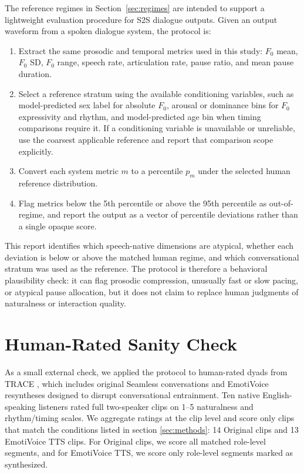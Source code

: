 \documentclass[conference]{IEEEtran}
\begin{document}
The reference regimes in Section~\ref{sec:regimes} are intended to support a lightweight evaluation procedure for S2S dialogue outputs. 
Given an output waveform from a spoken dialogue system, the protocol is:
\begin{enumerate}
    \item Extract the same prosodic and temporal metrics used in this study: $F_0$ mean, $F_0$ SD, $F_0$ range, speech rate, articulation rate, pause ratio, and mean pause duration.
    \item Select a reference stratum using the available conditioning variables, such as model-predicted sex label for absolute $F_0$, arousal or dominance bins for $F_0$ expressivity and rhythm, and model-predicted age bin when timing comparisons require it. If a conditioning variable is unavailable or unreliable, use the coarsest applicable reference and report that comparison scope explicitly.
    \item Convert each system metric $m$ to a percentile $p_m$ under the selected human reference distribution.
    \item Flag metrics below the 5th percentile or above the 95th percentile as out-of-regime, and report the output as a vector of percentile deviations rather than a single opaque score.
\end{enumerate}
This report identifies which speech-native dimensions are atypical, whether each deviation is below or above the matched human regime, and which conversational stratum was used as the reference. 
The protocol is therefore a behavioral plausibility check: it can flag prosodic compression, unusually fast or slow pacing, or atypical pause allocation, but it does not claim to replace human judgments of naturalness or interaction quality.


\section{Human-Rated Sanity Check}\label{sec:human_eval_check}

As a small external check, we applied the protocol to human-rated dyads from TRACE \cite{TRACE}, which includes original Seamless conversations and EmotiVoice resyntheses designed to disrupt conversational entrainment. 
Ten native English-speaking listeners rated full two-speaker clips on 1--5 naturalness and rhythm/timing scales. 
We aggregate ratings at the clip level and score only clips that match the conditions listed in section \ref{sec:methods}: 14 Original clips and 13 EmotiVoice TTS clips.
For Original clips, we score all matched role-level segments, and for EmotiVoice TTS, we score only role-level segments marked as synthesized.
\end{document}
